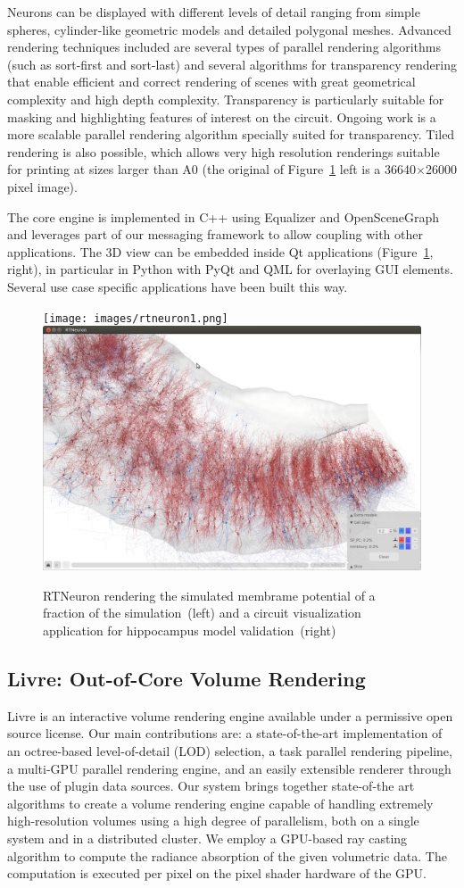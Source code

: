 \documentclass[10pt]{llncs}
\newcommand{\fig}[1]{Figure~\ref{#1}}
\begin{document}
Neurons can be displayed with different levels of detail ranging from simple
spheres, cylinder-like geometric models and detailed polygonal meshes. Advanced
rendering techniques included are several types of parallel rendering algorithms
(such as sort-first and sort-last) and several algorithms for transparency
rendering that enable efficient and correct rendering of scenes with great
geometrical complexity and high depth complexity. Transparency is particularly
suitable for masking and highlighting features of interest on the circuit.
Ongoing work is a more scalable parallel rendering algorithm specially suited
for transparency. Tiled rendering is also possible, which allows very high
resolution renderings suitable for printing at sizes larger than A0 (the
original of \fig{fRTNeuron} left is a 36640$\times$26000 pixel image).

The core engine is implemented in C++ using Equalizer and OpenSceneGraph and
leverages part of our messaging framework to allow coupling with other
applications. The 3D view can be embedded inside Qt applications
(\fig{fRTNeuron}, right), in particular in Python with PyQt and QML for
overlaying GUI elements. Several use case specific applications have been built
this way.

\begin{figure}[h!t]\center
  \texttt{[image: images/rtneuron1.png]}\hfil
  \includegraphics[width=.49\columnwidth]{images/rtneuron2.png}
  \caption{\label{fRTNeuron}RTNeuron rendering the simulated membrame potential of a fraction of the simulation~(left) and a circuit visualization application for hippocampus model validation~(right)}
\end{figure}

\subsection{Livre: Out-of-Core Volume Rendering}

Livre is an interactive volume rendering engine available under a permissive
open source license. Our main contributions are: a state-of-the-art
implementation of an octree-based level-of-detail (LOD) selection, a task
parallel rendering pipeline, a multi-GPU parallel rendering engine, and an
easily extensible renderer through the use of plugin data sources. Our system
brings together state-of-the art algorithms to create a volume rendering engine
capable of handling extremely high-resolution volumes using a high degree of
parallelism, both on a single system and in a distributed cluster. We employ a
GPU-based ray casting algorithm to compute the radiance absorption of the given
volumetric data. The computation is executed per pixel on the pixel shader
hardware of the GPU.
\end{document}
